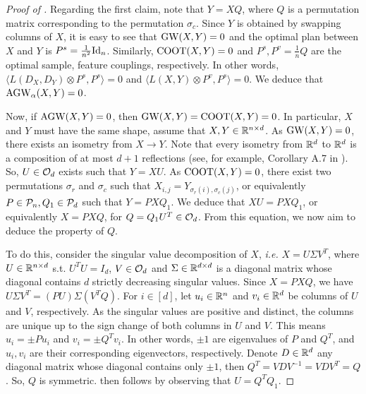 \begin{proof}[Proof of ]
  Regarding the first claim, note that $Y = X Q$,
  where $Q$ is a permutation matrix corresponding to the permutation $\sigma_c$.
  Since $Y$ is obtained by swapping columns of $X$, it is easy to see that $\text{GW}(X, Y) = 0$
  and the optimal plan between $X$ and $Y$ is $P^s = \frac{1}{n^2} \text{Id}_n$.
  Similarly, $\text{COOT}(X, Y) = 0$ and $P^s, P^v = \frac{1}{n}Q$ are the optimal sample,
  feature couplings, respectively. In other words,
  $\langle L(D_X,D_Y)\otimes P^s, P^s \rangle = 0$ and
  $\langle L(X,Y) \otimes P^v, P^s \rangle = 0$. We deduce that $\text{AGW}_{\alpha}(X, Y) = 0$.

  Now, if $\text{AGW}(X, Y) = 0$, then $\text{GW}(X, Y) = \text{COOT}(X, Y) = 0$. In particular,
  $X$ and $Y$ must have the same shape, assume that $X, Y \in \mathbb R^{n \times d}$.
  As $\text{GW}(X, Y) = 0$, there exists an isometry from $X \to Y$. Note that every isometry from
  $\mathbb R^d$ to $\mathbb R^d$ is a composition of at most $d+1$ reflections
  (see, for example, Corollary A.7 in \citep{Konrad}). So, $U \in \mathcal O_d$
  exists such that $Y = X U$. As $\text{COOT}(X, Y) = 0$, there exist two permutations
  $\sigma_r$ and $\sigma_c$ such that $X_{i, j} = Y_{\sigma_r(i), \sigma_c(j)}$,
  or equivalently $P \in \mathcal P_n, Q_1 \in \mathcal P_d$ such that $Y = P X Q_1$.
  We deduce that $X U = P X Q_1$, or equivalently $X = P X Q$, for
  $Q = Q_1 U^T \in \mathcal O_d$. From this equation, we now aim to deduce the property of $Q$.

  To do this, consider the singular value decomposition of $X$, \textit{\textit{i.e.}}
  $X = U \Sigma V^T$, where $U \in \mathbb R^{n \times d}$ s.t. $U^T U = I_d$,
  $V \in \mathcal O_d$ and $\Sigma \in \mathbb R^{d \times d}$ is a diagonal matrix
  whose diagonal contains $d$ strictly decreasing singular values. Since $X = P X Q$,
  we have $U \Sigma V^T = (PU) \Sigma (V^T Q)$. For $i \in [d]$, let $u_i \in \mathbb R^n$
  and $v_i \in \mathbb R^d$ be columns of $U$ and $V$, respectively.
  As the singular values are positive and distinct, the columns are unique up to
  the sign change of both columns in $U$ and $V$. This means $u_i = \pm Pu_i$ and
  $v_i = \pm Q^T v_i$. In other words, $\pm 1$ are eigenvalues of $P$ and $Q^T$, and
  $u_i, v_i$ are their corresponding eigenvectors, respectively. Denote $D \in \mathbb R^d$
  any diagonal matrix whose diagonal contains only $\pm 1$, then $Q^T = V D V^{-1} = V D V^T = Q$.
  So, $Q$ is symmetric.  then follows by observing that $U = Q^T Q_1$.
\end{proof}


